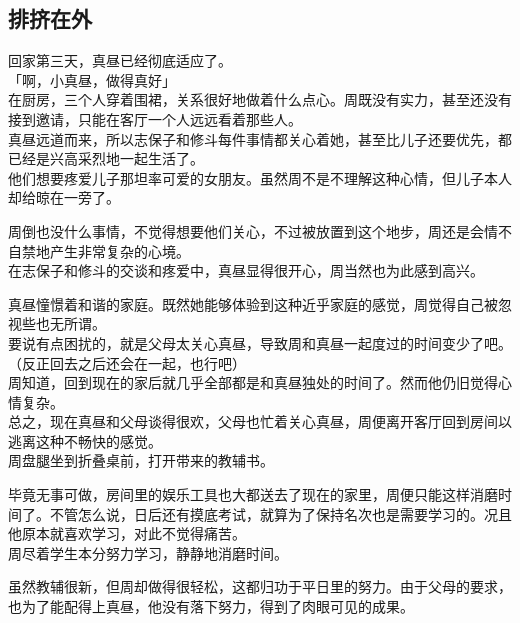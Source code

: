 \subsection{排挤在外}

回家第三天，真昼已经彻底适应了。\\

「啊，小真昼，做得真好」\\

在厨房，三个人穿着围裙，关系很好地做着什么点心。周既没有实力，甚至还没有接到邀请，只能在客厅一个人远远看着那些人。\\

真昼远道而来，所以志保子和修斗每件事情都关心着她，甚至比儿子还要优先，都已经是兴高采烈地一起生活了。\\

他们想要疼爱儿子那坦率可爱的女朋友。虽然周不是不理解这种心情，但儿子本人却给晾在一旁了。

周倒也没什么事情，不觉得想要他们关心，不过被放置到这个地步，周还是会情不自禁地产生非常复杂的心境。\\

在志保子和修斗的交谈和疼爱中，真昼显得很开心，周当然也为此感到高兴。

真昼憧憬着和谐的家庭。既然她能够体验到这种近乎家庭的感觉，周觉得自己被忽视些也无所谓。\\

要说有点困扰的，就是父母太关心真昼，导致周和真昼一起度过的时间变少了吧。\\

（反正回去之后还会在一起，也行吧）\\

周知道，回到现在的家后就几乎全部都是和真昼独处的时间了。然而他仍旧觉得心情复杂。\\

总之，现在真昼和父母谈得很欢，父母也忙着关心真昼，周便离开客厅回到房间以逃离这种不畅快的感觉。\\

周盘腿坐到折叠桌前，打开带来的教辅书。

毕竟无事可做，房间里的娱乐工具也大都送去了现在的家里，周便只能这样消磨时间了。不管怎么说，日后还有摸底考试，就算为了保持名次也是需要学习的。况且他原本就喜欢学习，对此不觉得痛苦。\\

周尽着学生本分努力学习，静静地消磨时间。

虽然教辅很新，但周却做得很轻松，这都归功于平日里的努力。由于父母的要求，也为了能配得上真昼，他没有落下努力，得到了肉眼可见的成果。\\

